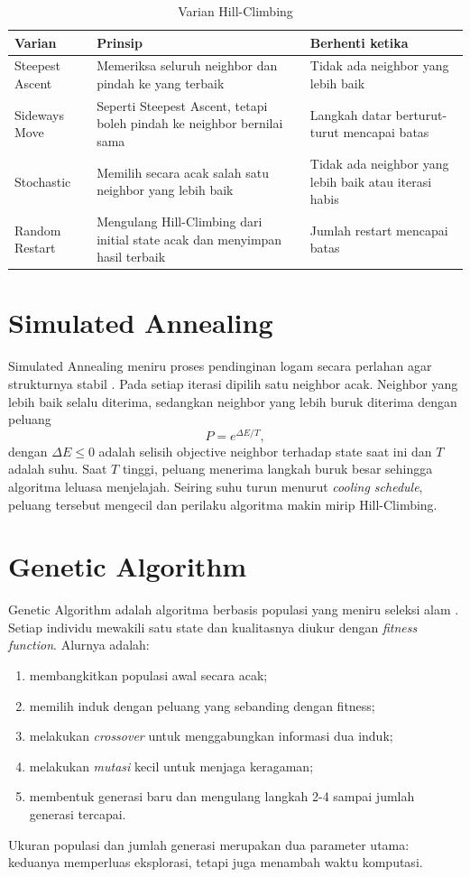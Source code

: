 \documentclass[12pt,a4paper]{report}
\newcommand{\hd}[1]{\cellcolor{hdr}\textbf{#1}}
\begin{document}
\begin{table}[H]
\centering
\caption{Varian Hill-Climbing}\label{tab:varianhc}
\small
\begin{tabular}{|L{3cm}|L{5.6cm}|L{4.6cm}|}
\hline
\hd{Varian} & \hd{Prinsip} & \hd{Berhenti ketika} \\ \hline
Steepest Ascent & Memeriksa seluruh neighbor dan pindah ke yang terbaik & Tidak ada neighbor yang lebih baik \\ \hline
Sideways Move & Seperti Steepest Ascent, tetapi boleh pindah ke neighbor bernilai sama & Langkah datar berturut-turut mencapai batas \\ \hline
Stochastic & Memilih secara acak salah satu neighbor yang lebih baik & Tidak ada neighbor yang lebih baik atau iterasi habis \\ \hline
Random Restart & Mengulang Hill-Climbing dari initial state acak dan menyimpan hasil terbaik & Jumlah restart mencapai batas \\ \hline
\end{tabular}
\end{table}

\section{Simulated Annealing}
Simulated Annealing meniru proses pendinginan logam secara perlahan agar strukturnya stabil
\cite{khodra4}. Pada setiap iterasi dipilih satu neighbor acak. Neighbor yang lebih baik selalu
diterima, sedangkan neighbor yang lebih buruk diterima dengan peluang
\[
P = e^{\Delta E / T},
\]
dengan $\Delta E \le 0$ adalah selisih objective neighbor terhadap state saat ini dan $T$ adalah
suhu. Saat $T$ tinggi, peluang menerima langkah buruk besar sehingga algoritma leluasa
menjelajah. Seiring suhu turun menurut \textit{cooling schedule}, peluang tersebut mengecil dan
perilaku algoritma makin mirip Hill-Climbing.

\section{Genetic Algorithm}
Genetic Algorithm adalah algoritma berbasis populasi yang meniru seleksi alam \cite{khodra5}.
Setiap individu mewakili satu state dan kualitasnya diukur dengan \textit{fitness function}.
Alurnya adalah:
\begin{enumerate}[leftmargin=1.5cm]
  \item membangkitkan populasi awal secara acak;
  \item memilih induk dengan peluang yang sebanding dengan fitness;
  \item melakukan \textit{crossover} untuk menggabungkan informasi dua induk;
  \item melakukan \textit{mutasi} kecil untuk menjaga keragaman;
  \item membentuk generasi baru dan mengulang langkah 2-4 sampai jumlah generasi tercapai.
\end{enumerate}
Ukuran populasi dan jumlah generasi merupakan dua parameter utama: keduanya memperluas
eksplorasi, tetapi juga menambah waktu komputasi.
\end{document}
